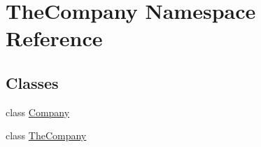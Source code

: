 \hypertarget{namespace_the_company}{}\section{The\+Company Namespace Reference}
\label{namespace_the_company}
\subsection*{Classes}
\begin{DoxyCompactItemize}
\item 
class \hyperlink{class_the_company_1_1_company}{Company}
\item 
class \hyperlink{class_the_company_1_1_the_company}{The\+Company}
\end{DoxyCompactItemize}
